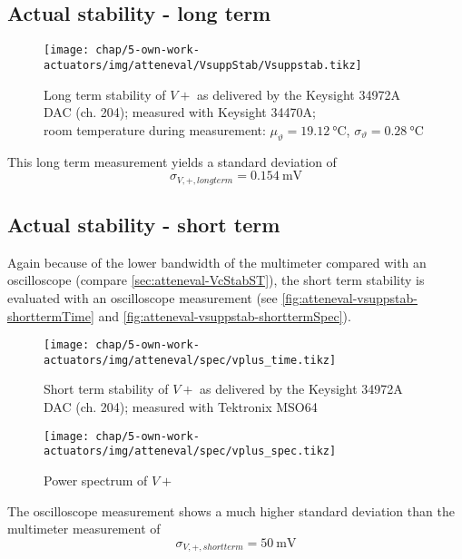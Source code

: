 \FloatBarrier
\newpage
\subsection{Actual stability - long term}

\begin{figure}[tb]
	\centering
	\texttt{[image: chap/5-own-work-actuators/img/atteneval/VsuppStab/Vsuppstab.tikz]}
	\caption{Long term stability of $V+$ as delivered by the Keysight 34972A DAC (ch. 204); measured with Keysight 34470A;\\room temperature during measurement: $\mu_\vartheta=\SI{19.12}{\degreeCelsius}$, $\sigma_\vartheta=\SI{0.28}{\degreeCelsius}$}
	\label{fig:atteneval-vsupplstab-longterm}
\end{figure}

This long term measurement yields a standard deviation of
\begin{equation}
\sigma_{V,+,longterm} = \SI{0.154}{\milli\volt}
\end{equation}

\FloatBarrier
\subsection{Actual stability - short term}
Again because of the lower bandwidth of the multimeter compared with an oscilloscope (compare \autoref{sec:atteneval-VcStabST}), the short term stability is evaluated with an oscilloscope measurement (see \autoref{fig:atteneval-vsuppstab-shorttermTime} and \autoref{fig:atteneval-vsuppstab-shorttermSpec}).

\begin{figure}[tb]
	\centering
	\texttt{[image: chap/5-own-work-actuators/img/atteneval/spec/vplus\_time.tikz]}
	\caption{Short term stability of $V+$ as delivered by the Keysight 34972A DAC (ch. 204); measured with Tektronix MSO64}
	\label{fig:atteneval-vsuppstab-shorttermTime}
\end{figure}

\begin{figure}[tb]
	\centering
	\texttt{[image: chap/5-own-work-actuators/img/atteneval/spec/vplus\_spec.tikz]}
	\caption{Power spectrum of $V+$}
	\label{fig:atteneval-vsuppstab-shorttermSpec}
\end{figure}

The oscilloscope measurement shows a much higher standard deviation than the multimeter measurement of
\begin{equation}
\sigma_{V,+,shortterm} = \SI{50}{\milli\volt}
\end{equation}

